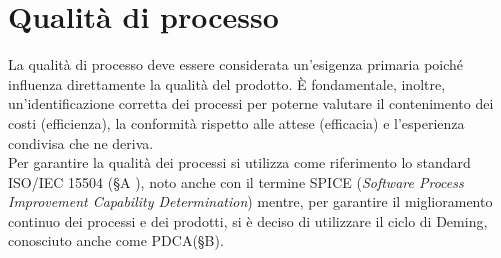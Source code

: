 \section{Qualità di processo}
La qualità di processo deve essere considerata un'esigenza primaria poiché influenza direttamente la qualità del prodotto. È fondamentale, inoltre, un'identificazione corretta dei processi per poterne valutare il contenimento dei costi (efficienza), la conformità rispetto alle attese (efficacia) e l'esperienza condivisa che ne deriva. \\
Per garantire la qualità dei processi si utilizza come riferimento lo standard ISO/IEC 15504 (§A ), noto anche con il termine SPICE (\textit{Software Process Improvement Capability Determination}) mentre, per garantire il miglioramento continuo dei processi e dei prodotti, si è deciso di utilizzare il ciclo di Deming, conosciuto anche come PDCA(\S{B}).



